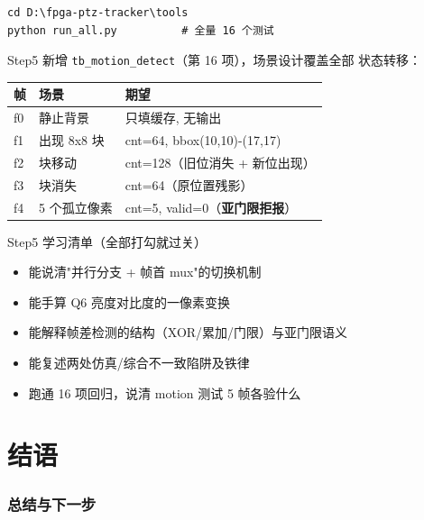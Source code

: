 \documentclass[11pt]{ctexart}
\newcommand{\code}[1]{\texttt{#1}}
\begin{document}
\begin{Verbatim}
cd D:\fpga-ptz-tracker\tools
python run_all.py          # 全量 16 个测试
\end{Verbatim}

Step5 新增 \code{tb\_motion\_detect}（第 16 项），场景设计覆盖全部
状态转移：

\begin{center}
\begin{tabular}{lll}
\toprule
\rowcolor{rowtint}\textbf{帧} & \textbf{场景} & \textbf{期望} \\
\midrule
f0 & 静止背景 & 只填缓存, 无输出 \\
f1 & 出现 8x8 块 & cnt=64, bbox(10,10)-(17,17) \\
f2 & 块移动 & cnt=128（旧位消失 + 新位出现） \\
f3 & 块消失 & cnt=64（原位置残影） \\
f4 & 5 个孤立像素 & cnt=5, valid=0（\textbf{亚门限拒报}） \\
\bottomrule
\end{tabular}
\end{center}

\begin{okbox}{Step5 学习清单（全部打勾就过关）}
\begin{itemize}
  \item 能说清"并行分支 + 帧首 mux"的切换机制
  \item 能手算 Q6 亮度对比度的一像素变换
  \item 能解释帧差检测的结构（XOR/累加/门限）与亚门限语义
  \item 能复述两处仿真/综合不一致陷阱及铁律
  \item 跑通 16 项回归，说清 motion 测试 5 帧各验什么
\end{itemize}
\end{okbox}



\part*{结语}
\clearpage
\section*{总结与下一步}
\end{document}
